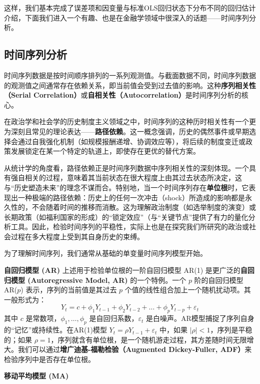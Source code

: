 这样，我们基本完成了误差项和因变量与标准OLS回归状态下分布不同的回归估计介绍，下面我们进入一个有趣、也是在金融学领域中很深入的话题——时间序列分析。

\subsection{时间序列分析}

时间序列数据是按时间顺序排列的一系列观测值。与截面数据不同，时间序列数据的观测值之间通常存在依赖关系，即当前值会受到过去值的影响。这种\textbf{序列相关性（Serial Correlation）}或\textbf{自相关性（Autocorrelation）}是时间序列分析的核心。

在政治学和社会学的历史制度主义领域之中，时间序列的这种历时相关性有一个更为深刻且常见的理论表达——\textbf{路径依赖}。这一概念强调，历史的偶然事件或早期选择会通过自我强化机制（如规模报酬递增、协调效应等），将后续的制度变迁或政策发展锁定在某一个特定的轨道上，即使存在更优的替代方案。

从统计学的角度看，路径依赖正是时间序列数据中序列相关性的深刻体现。一个具有强自相关的过程，意味着其当前状态在很大程度上由其过去状态所决定，这与“历史塑造未来”的理念不谋而合。特别地，当一个时间序列存在\textbf{单位根}时，它表现出一种极端的路径依赖：历史上的任何一次冲击（shock）所造成的影响都是永久性的，不会随着时间的推移而消散。这为理解政治制度（如选举制度的演变）或长期政策（如福利国家的形成）的“锁定效应”（与“关键节点”提供了有力的量化分析工具。因此，检验时间序列的平稳性，实际上也是在探究我们所研究的政治或社会过程在多大程度上受到其自身历史的束缚。

为了理解时间序列，我们通常从基础的单变量时间序列模型开始。

\textbf{自回归模型 (AR)}
上述用于检验单位根的一阶自回归模型 AR(1) 是更广泛的\textbf{自回归模型 (Autoregressive Model, AR)} 的一个特例。一个 $p$ 阶的自回归模型 AR($p$) 表示，序列的当前值是其过去 $p$ 个值的线性组合加上一个随机扰动项。其一般形式为：
\begin{equation}
	Y_t = c + \phi_1 Y_{t-1} + \phi_2 Y_{t-2} + \dots + \phi_p Y_{t-p} + \varepsilon_t
\end{equation}
其中 $c$ 是常数项，$\phi_1, \dots, \phi_p$ 是自回归系数，$\varepsilon_t$ 是白噪声。AR模型捕捉了序列自身的“记忆”或持续性。在AR(1)模型 $Y_t = \rho Y_{t-1} + \varepsilon_t$ 中，如果 $|\rho|<1$，序列是平稳的；如果 $\rho=1$，序列就含有单位根，是一个随机游走过程，其方差随时间无限增大。我们可以通过\textbf{增广迪基-福勒检验（Augmented Dickey-Fuller, ADF）}来检验序列中是否存在单位根。

\textbf{移动平均模型 (MA)}


